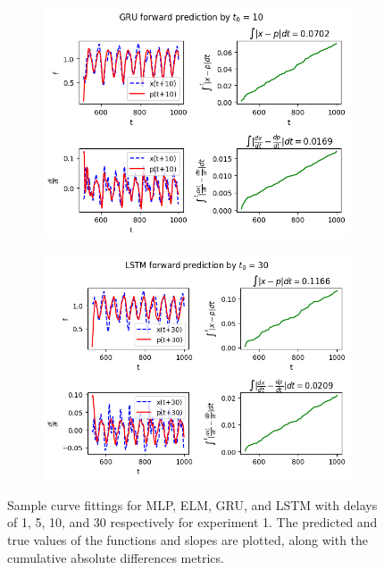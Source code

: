 \documentclass[11pt]{article}
\begin{document}
\begin{figure}[t]
\begin{center}
\begin{subfigure}{0.48\textwidth}
        \includegraphics[width=\textwidth]{figures/GRU_10.png}
        \caption{}
      \end{subfigure}
      \begin{subfigure}{0.48\textwidth}
        \includegraphics[width=\textwidth]{figures/LSTM_30.png}
        \caption{}
      \end{subfigure}
 \end{center}
 \caption{Sample curve fittings for MLP, ELM, GRU, and LSTM with
   delays of 1, 5, 10, and 30 respectively for experiment 1. The predicted and true
   values of the functions and slopes are plotted, along with the
   cumulative absolute differences metrics.}
 \label{fig:func_evals}
\end{figure}
\end{document}
